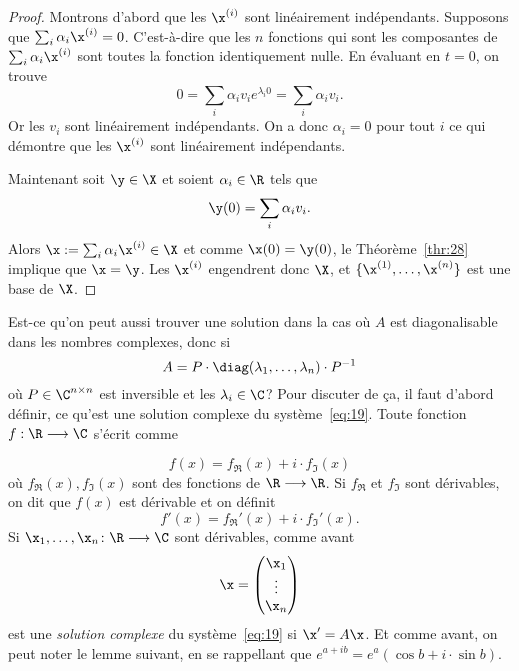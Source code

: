 \begin{proof}
  Montrons d'abord que les $\x^{(i)}$ sont linéairement indépendants. Supposons que $\sum_{i} \alpha_i \x^{(i)} = 0$. C'est-à-dire que les $n$ fonctions qui sont les composantes de $\sum_{i} \alpha_i \x^{(i)}$ sont toutes la fonction identiquement nulle. En évaluant en $t=0$, on trouve
  \begin{displaymath}
    0 = \sum_i \alpha_i v_i e^{\lambda_i 0} = \sum_i \alpha_i v_i.  
  \end{displaymath}
Or les $v_i$ sont linéairement indépendants. On a donc $\alpha_i = 0$ pour tout $i$ ce qui démontre que les $\x^{(i)}$ sont linéairement indépendants. 


Maintenant soit $\y \in \X$ et soient  $\alpha_i \in \R$  tels que 
\begin{displaymath}
  \y(0) = \sum_i \alpha_i v_i.  
\end{displaymath}
Alors $\x := \sum_i \alpha_i \x^{(i)} \in \X$  et comme $\x(0) = \y(0)$, le Théorème~\ref{thr:28} implique que $\x = \y$. Les $\x^{(i)}$ engendrent donc $\X$, et $\{\x^{(1)},\dots, \x^{(n)}\}$ est une base de $\X$. 
\end{proof}


Est-ce qu'on peut aussi trouver une solution dans la cas où $A$ est diagonalisable dans les nombres complexes, donc si 
\begin{displaymath}
A=P \cdot \diag(\lambda_1,\dots,\lambda_n) \cdot P^{-1} 
\end{displaymath}
où $P \in \C^{n \times n}$ est inversible et les  $\lambda_i \in \C$? Pour discuter de ça, il faut d'abord définir, ce qu'est une solution complexe du système~\eqref{eq:19}. Toute fonction $f: \R \longrightarrow \C$ s'écrit comme 

\begin{displaymath}
  f(x) = f_{\Re}(x) + i \cdot f_{\Im}(x) 
\end{displaymath}
où $f_{\Re}(x), f_{\Im}(x)$ sont des fonctions de $ \R \longrightarrow \R$.  Si $f_\Re$ et $f_\Im$ sont dérivables, on dit que $f(x)$ est dérivable et on définit 
\begin{displaymath}
  f'(x) = f_\Re'(x) + i \cdot f_\Im'(x). 
\end{displaymath}
Si $\x_1,\dots,\x_n\colon \R \longrightarrow \C$ sont dérivables, comme avant 
\begin{displaymath}
  \x =
  \begin{pmatrix}
    \x_1\\ \vdots \\ \x_n
  \end{pmatrix}
\end{displaymath}
est une \emph{solution complexe} du système~\eqref{eq:19} si $\x' = A\x$.   Et comme avant, on peut noter le lemme suivant, en se rappellant que $e^{a + ib} = e^a (\cos b + i \cdot \sin b)$. 


